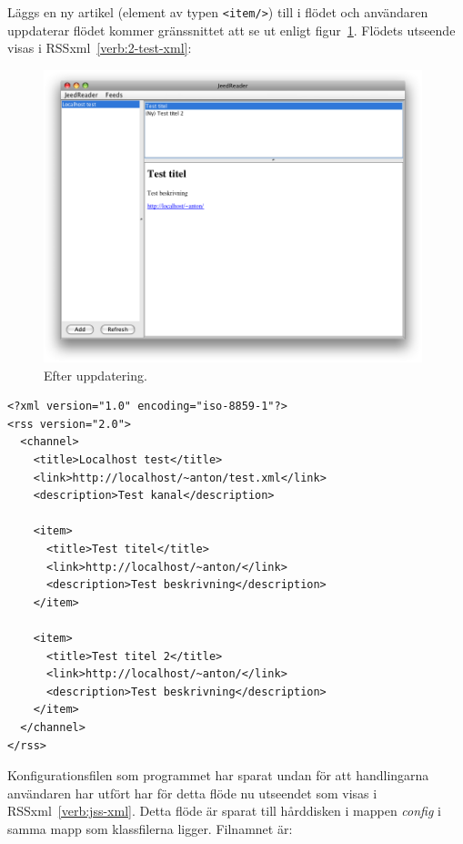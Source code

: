 \documentclass[titlepage, twoside, a4paper, 12pt]{article}
\begin{document}
Läggs en ny artikel (element av typen \verb!<item/>!) till i flödet
och användaren uppdaterar flödet kommer gränssnittet att se ut enligt
figur~\ref{fig:update-test2-out}. Flödets utseende visas i
RSSxml~\ref{verb:2-test-xml}:

\begin{figure}[!hbp]
  \begin{center}
    \includegraphics[width=110mm]{images/update-test2-out.png}
    \caption{Efter uppdatering.}
    \label{fig:update-test2-out}
  \end{center}
\end{figure}

\begin{program}
\begin{footnotesize}
\begin{verbatim}
<?xml version="1.0" encoding="iso-8859-1"?>
<rss version="2.0">
  <channel>
    <title>Localhost test</title>
    <link>http://localhost/~anton/test.xml</link>
    <description>Test kanal</description>

    <item>
      <title>Test titel</title>
      <link>http://localhost/~anton/</link>
      <description>Test beskrivning</description>
    </item>

    <item>
      <title>Test titel 2</title>
      <link>http://localhost/~anton/</link>
      <description>Test beskrivning</description>
    </item>
  </channel>
</rss>
\end{verbatim}
\end{footnotesize}
\caption{Flöde efter uppdatering.}
\label{verb:2-test-xml}
\end{program}

Konfigurationsfilen som programmet har sparat undan för att
handlingarna användaren har utfört har för detta flöde nu utseendet
som visas i RSSxml~\ref{verb:jss-xml}. Detta flöde är sparat till
hårddisken i mappen \textit{config} i samma mapp som klassfilerna
ligger. Filnamnet är:
\end{document}
